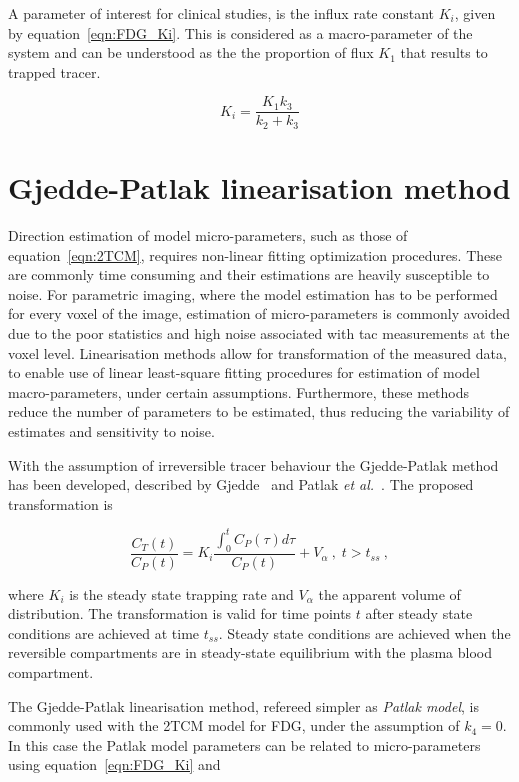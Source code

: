 A parameter of interest for clinical studies, is the influx rate constant $K_i$, given by equation~\ref{eqn:FDG_Ki}. This is considered as a macro-parameter of the system and can be understood as the the proportion of flux $K_1$ that results to trapped tracer. 

\begin{equation}
K_i = \frac{K_1 k_3}{k_2+k_3}
\label{eqn:FDG_Ki}
\end{equation}


\section{Gjedde-Patlak linearisation method}
Direction estimation of model micro-parameters, such as those of equation~\ref{eqn:2TCM}, requires non-linear fitting optimization procedures. These are commonly time consuming and their estimations are heavily susceptible to noise.
For parametric imaging, where the model estimation has to be performed for every voxel of the image, estimation of micro-parameters is commonly avoided due to the poor statistics and high noise associated with \gls{tac} measurements at the voxel level. 
Linearisation methods allow for transformation of the measured data, to enable use of linear least-square fitting procedures for estimation of model macro-parameters, under certain assumptions. Furthermore, these methods reduce the number of parameters to be estimated, thus reducing the variability of estimates and sensitivity to noise. 

With the assumption of irreversible tracer behaviour the Gjedde-Patlak method has been developed, described by Gjedde~\cite{Gjedde1982} and Patlak \textit{et al.}~\cite{Patlak1985}. The proposed transformation is

\begin{equation}
\label{eqn:PatlakModel}
\frac{C_{T}(t)}{C_{P}(t)} = K_i \frac{\int_{0}^{t} C_{P}(\tau) d\tau}{ C_{P}(t)} + V_{\alpha}   \ , \;  t>t_{ss} \ ,
\end{equation}

where $K_i$ is the steady state trapping rate and $V_{\alpha}$ the apparent volume of distribution. The transformation is valid for time points $t$ after steady state conditions are achieved at time $t_{ss}$. Steady state conditions are achieved when the reversible compartments are in steady-state equilibrium with the plasma blood compartment. 

The Gjedde-Patlak linearisation method, refereed simpler as \textit{Patlak model}, is commonly used with the 2TCM model for FDG, under the assumption of $k_4=0$. In this case the Patlak model parameters can be related to micro-parameters using equation~\ref{eqn:FDG_Ki} and 

